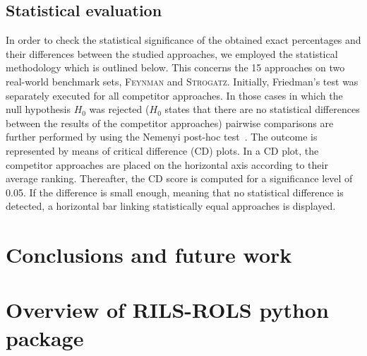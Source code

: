 \documentclass[a4paper,12pt]{elsarticle}
\begin{document}
\subsection{Statistical evaluation}

In order to check the statistical significance of the obtained exact percentages and their differences between the studied approaches, we employed the statistical methodology which is outlined below. This concerns the 15 approaches on two real-world benchmark sets, \textsc{Feynman} and \textsc{Strogatz}. Initially, Friedman’s test was separately executed for all competitor approaches.      In those cases in which the null hypothesis $H_0$ was rejected ($H_0$ states that there are no statistical differences between the results of the competitor approaches) pairwise comparisons are further performed by using the Nemenyi post-hoc test~\cite{pohlert2014pairwise}. The outcome is represented by means of critical difference (CD) plots. In a CD plot, the competitor approaches are placed on the horizontal axis according to their average ranking. Thereafter, the CD score is computed for a significance level of 0.05. If the difference is small enough, meaning that no statistical difference is detected, a horizontal bar linking statistically equal approaches is displayed.  


\section{Conclusions and future work}\label{sec:conclusions}
  
 \newpage
 \appendix
 
 \section{Overview of RILS-ROLS python package}\label{sec:appendix-1}
  
  
  
 
\newpage
	
	

	
\end{document}
